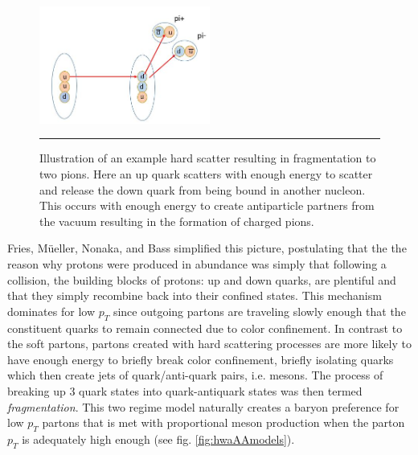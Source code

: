 \begin{figure}[htbp!]
  \centering
    \includegraphics[width=0.5\textwidth]{Figures/fragmentationdiag.JPG}
    \rule{35em}{0.5pt}
  \caption[Illustration of an example hard scatter resulting in fragmentation to two pions]{Illustration of an example hard scatter resulting in fragmentation to two pions. Here an up quark scatters with enough energy to scatter and release the down quark from being bound in another nucleon. This occurs with enough energy to create antiparticle partners from the vacuum resulting in the formation of charged pions.}
  \label{fig:fragmentationdiag}
\end{figure} 
Fries, M{\"u}eller, Nonaka, and Bass simplified this picture, postulating that the the reason why protons were produced in abundance was simply that following a collision, the building blocks of protons: up and down quarks, are plentiful and that they simply recombine back into their confined states. This mechanism dominates for low $p_{T}$ since outgoing partons are traveling slowly enough that the constituent quarks to remain connected due to color confinement. In contrast to the soft partons, partons created with hard scattering processes are more likely to have enough energy to briefly break color confinement, briefly isolating quarks which then create jets of quark/anti-quark pairs, i.e. mesons. The process of breaking up 3 quark states into quark-antiquark states was then termed \textit{fragmentation}. This two regime model naturally creates a baryon preference for low $p_{T}$ partons that is met with proportional meson production when the parton $p_{T}$ is adequately high enough (see fig. \ref{fig:hwaAAmodels}).

